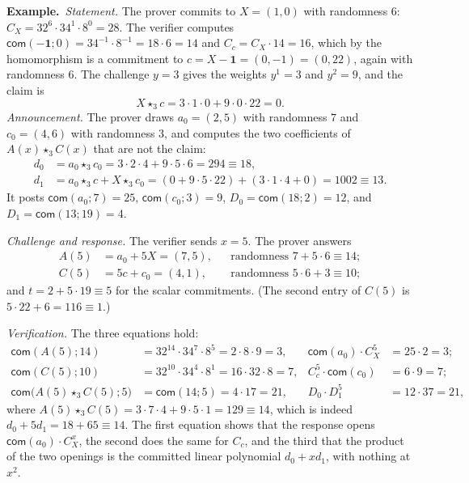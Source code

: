 \documentclass[11pt,a4paper]{article}
\newcommand{\com}{\mathsf{com}}
\newcommand{\ex}[1]{\par\medskip\noindent\textbf{Example.}~#1\par\medskip}
\theoremstyle{remark}
\begin{document}
\ex{\emph{Statement.} The prover commits to $X = (1, 0)$ with randomness
$6$: $C_X = 32^{6} \cdot 34^{1} \cdot 8^{0} = 28$. The verifier computes
$\com(-\mathbf{1}; 0) = 34^{-1} \cdot 8^{-1} = 18 \cdot 6 = 14$ and
$C_c = C_X \cdot 14 = 16$, which by the homomorphism is a commitment to
$c = X - \mathbf{1} = (0, -1) = (0, 22)$, again with randomness $6$. The
challenge $y = 3$ gives the weights $y^{1} = 3$ and $y^{2} = 9$, and the
claim is
\[
  X \star_3 c = 3 \cdot 1 \cdot 0 + 9 \cdot 0 \cdot 22 = 0 .
\]
\emph{Announcement.} The prover draws $a_0 = (2, 5)$ with randomness $7$
and $c_0 = (4, 6)$ with randomness $3$, and computes the two coefficients
of $A(x) \star_3 C(x)$ that are not the claim:
\begin{align*}
  d_0 &= a_0 \star_3 c_0 = 3 \cdot 2 \cdot 4 + 9 \cdot 5 \cdot 6 = 294 \equiv 18,\\
  d_1 &= a_0 \star_3 c + X \star_3 c_0 = (0 + 9 \cdot 5 \cdot 22) + (3 \cdot 1 \cdot 4 + 0) = 1002 \equiv 13 .
\end{align*}
It posts $\com(a_0; 7) = 25$, $\com(c_0; 3) = 9$, $D_0 = \com(18; 2) =
12$, and $D_1 = \com(13; 19) = 4$.

\emph{Challenge and response.} The verifier sends $x = 5$. The prover
answers
\begin{align*}
  A(5) &= a_0 + 5X = (7, 5), & &\text{randomness } 7 + 5 \cdot 6 \equiv 14;\\
  C(5) &= 5c + c_0 = (4, 1), & &\text{randomness } 5 \cdot 6 + 3 \equiv 10;
\end{align*}
and $t = 2 + 5 \cdot 19 \equiv 5$ for the scalar commitments. (The second
entry of $C(5)$ is $5 \cdot 22 + 6 = 116 \equiv 1$.)

\emph{Verification.} The three equations hold:
\begin{align*}
  \com(A(5); 14) &= 32^{14} \cdot 34^{7} \cdot 8^{5} = 2 \cdot 8 \cdot 9 = 3,
    & \com(a_0) \cdot C_X^{5} &= 25 \cdot 2 = 3;\\
  \com(C(5); 10) &= 32^{10} \cdot 34^{4} \cdot 8^{1} = 16 \cdot 32 \cdot 8 = 7,
    & C_c^{5} \cdot \com(c_0) &= 6 \cdot 9 = 7;\\
  \com\big(A(5) \star_3 C(5); 5\big) &= \com(14; 5) = 4 \cdot 17 = 21,
    & D_0 \cdot D_1^{5} &= 12 \cdot 37 = 21,
\end{align*}
where $A(5) \star_3 C(5) = 3 \cdot 7 \cdot 4 + 9 \cdot 5 \cdot 1 = 129
\equiv 14$, which is indeed $d_0 + 5 d_1 = 18 + 65 \equiv 14$. The first
equation shows that the response opens $\com(a_0) \cdot C_X^{x}$, the second
does the same for $C_c$, and the third that the product of the two openings
is the committed linear polynomial $d_0 + x d_1$, with nothing at $x^2$.

}
\end{document}
